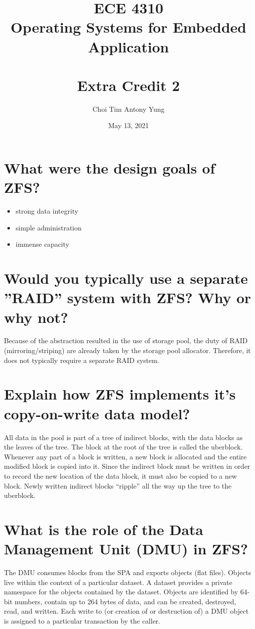 \documentclass{article}
\title{ECE 4310\\Operating Systems for Embedded Application\\\,\\Extra Credit 2}
\author{Choi Tim Antony Yung}
\date{May 13, 2021}
\begin{document}
\maketitle

\thispagestyle{empty}
\setcounter{page}{0}

\newpage

\section{What were the design goals of ZFS?}
\begin{itemize}
  \item strong data integrity
  \item simple administration
  \item immense capacity
\end{itemize}

\section{Would you typically use a separate ”RAID” system with ZFS? Why or why not?}
Because of the abstraction resulted in the use of storage pool, the duty of RAID (mirroring/striping)
are already taken by the storage pool allocator. Therefore, it does not typically require a separate RAID system.

\section{Explain how ZFS implements it’s copy-on-write data model?}
All data in the pool is part of a tree of indirect blocks, with the data blocks as the leaves of the tree. The block at the root of the tree is called the uberblock. Whenever any part of a block is written, a new block is allocated and the entire modified block is copied into it. Since the indirect block must be written in order to record the new location of the data block, it must also be copied to a new block. Newly written indirect blocks “ripple” all the way up the tree to the uberblock.

\section{What is the role of the Data Management Unit (DMU) in ZFS?}
The DMU consumes blocks from the SPA and exports objects (flat files). Objects live within the context of a particular dataset. A dataset provides a private namespace for the objects contained by the dataset. Objects are identified by 64-bit numbers, contain up to 264 bytes of data, and can be created, destroyed, read, and written. Each write to (or creation of or destruction of) a DMU object is assigned to a particular transaction by the caller.
\end{document}
